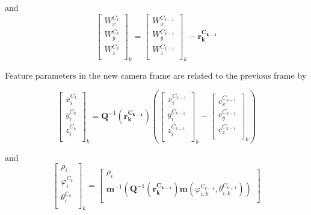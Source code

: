 \noindent and
\begin{equation}
\begin{bmatrix}
W_{x}^{C_{k}} \\
W_{y}^{C_{k}} \\
W_{z}^{C_{k}} \\
\end{bmatrix}_{k}= \begin{bmatrix}
W_{x}^{C_{k-1}} \\
W_{y}^{C_{k-1}} \\
W_{z}^{C_{k-1}} \\
\end{bmatrix}_{k}-\mathbf{r_k^{C_{k-1}}}
\end{equation}
 
Feature parameters in the new camera frame are related to the previous frame 
by

\begin{equation}
\begin{bmatrix}
x_{i}^{C_{k}} \\
y_{i}^{C_{k}} \\
z_{i}^{C_{k}} \\
\end{bmatrix}_{k}=\mathbf{Q}^{-1}(\mathbf{r_k^{C_{k-1}}})\left(
\begin{bmatrix}
x_{i}^{C_{k-1}} \\
y_{i}^{C_{k-1}} \\
z_{i}^{C_{k-1}} \\
\end{bmatrix}_{k}- \begin{bmatrix}
c_{x}^{C_{k-1}} \\
c_{y}^{C_{k-1}} \\
c_{z}^{C_{k-1}} \\
\end{bmatrix}_{k}\right)
\end{equation}

\noindent and
\begin{equation}
\begin{bmatrix}
\rho_{i} \\
\varphi_{i}^{C_{k}} \\
\theta_{i}^{C_{k}} \\
\end{bmatrix}_{k}=
\begin{bmatrix}
\rho _{i} \\
\mathbf{m}^{-1}\left(\mathbf{Q}^{-1}(\mathbf{r_k^{C_{k-1}}})\mathbf{m}(\varphi _{i, k}^{C_{k-1}}, \theta _{i, k}^{C_{k-1}})\right) \\
\end{bmatrix}
\end{equation}

